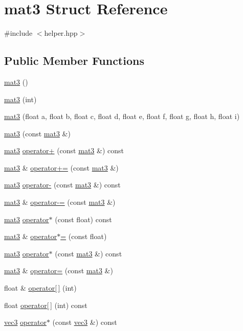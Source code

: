 \hypertarget{structmat3}{\section{mat3 Struct Reference}
\label{structmat3}
}


{\ttfamily \#include $<$helper.\+hpp$>$}

\subsection*{Public Member Functions}
\begin{DoxyCompactItemize}
\item 
\hyperlink{structmat3_a463027040addb1c56fe84c91b74b8d79}{mat3} ()
\item 
\hyperlink{structmat3_ae70cff0193ac1f77c61df7a2f4c00ef6}{mat3} (int)
\item 
\hyperlink{structmat3_ad5f393d1a6f7986207680e54e81f9906}{mat3} (float a, float b, float c, float d, float e, float f, float g, float h, float i)
\item 
\hyperlink{structmat3_aa761860db5b00723649f4751b34df952}{mat3} (const \hyperlink{structmat3}{mat3} \&)
\item 
\hyperlink{structmat3}{mat3} \hyperlink{structmat3_af00e96acb51cd53669a5d3a169d96e65}{operator+} (const \hyperlink{structmat3}{mat3} \&) const 
\item 
\hyperlink{structmat3}{mat3} \& \hyperlink{structmat3_a51c6ec6fd44fcd36022441064f6c285d}{operator+=} (const \hyperlink{structmat3}{mat3} \&)
\item 
\hyperlink{structmat3}{mat3} \hyperlink{structmat3_aa4a3e2abd71f23304e1069d3da0d60c0}{operator-\/} (const \hyperlink{structmat3}{mat3} \&) const 
\item 
\hyperlink{structmat3}{mat3} \& \hyperlink{structmat3_a1718976498fb7eddf36bbfebe76c0731}{operator-\/=} (const \hyperlink{structmat3}{mat3} \&)
\item 
\hyperlink{structmat3}{mat3} \hyperlink{structmat3_ab7b1c00fe3bfe66e48066f03a7c99cf5}{operator$\ast$} (const float) const 
\item 
\hyperlink{structmat3}{mat3} \& \hyperlink{structmat3_a782476876e4828df805c118734cef45f}{operator$\ast$=} (const float)
\item 
\hyperlink{structmat3}{mat3} \hyperlink{structmat3_affc4320ad21bf2276b32da8d96006a08}{operator$\ast$} (const \hyperlink{structmat3}{mat3} \&) const 
\item 
\hyperlink{structmat3}{mat3} \& \hyperlink{structmat3_aecf76e04b3d56cc333129fef2a832bb6}{operator=} (const \hyperlink{structmat3}{mat3} \&)
\item 
float \& \hyperlink{structmat3_afabeddfb3c711e2b0f806d9d8fa0534c}{operator\mbox{[}$\,$\mbox{]}} (int)
\item 
float \hyperlink{structmat3_ad61ce758d2b8def99daa43bded003023}{operator\mbox{[}$\,$\mbox{]}} (int) const 
\item 
\hyperlink{structvec3}{vec3} \hyperlink{structmat3_a08a5fd5fdb707a1ffe11b4e2c8b76beb}{operator$\ast$} (const \hyperlink{structvec3}{vec3} \&) const 
\end{DoxyCompactItemize}
